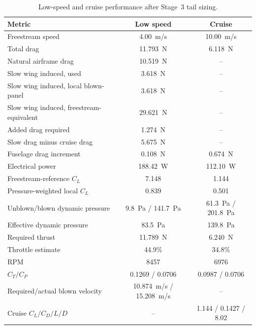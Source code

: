 \documentclass[11pt]{article}
\begin{document}
\begin{table}[H]
\centering
\begin{tabular}{lcc}
\toprule
Metric & Low speed & Cruise \\
\midrule
Freestream speed & \SI{4.00}{m/s} & \SI{10.00}{m/s} \\
Total drag & \SI{11.793}{N} & \SI{6.118}{N} \\
Natural airframe drag & \SI{10.519}{N} & -- \\
Slow wing induced, used & \SI{3.618}{N} & -- \\
Slow wing induced, local blown-panel & \SI{3.618}{N} & -- \\
Slow wing induced, freestream-equivalent & \SI{29.621}{N} & -- \\
Added drag required & \SI{1.274}{N} & -- \\
Slow drag minus cruise drag & \SI{5.675}{N} & -- \\
Fuselage drag increment & \SI{0.108}{N} & \SI{0.674}{N} \\
Electrical power & \SI{188.42}{W} & \SI{112.10}{W} \\
Freestream-reference \(C_L\) & 7.148 & 1.144 \\
Pressure-weighted local \(C_L\) & 0.839 & 0.501 \\
Unblown/blown dynamic pressure & \SI{9.8}{Pa} / \SI{141.7}{Pa} & \SI{61.3}{Pa} / \SI{201.8}{Pa} \\
Effective dynamic pressure & \SI{83.5}{Pa} & \SI{139.8}{Pa} \\
Required thrust & \SI{11.789}{N} & \SI{6.240}{N} \\
Throttle estimate & 44.9\% & 34.8\% \\
RPM & \num{8457} & \num{6976} \\
\(C_T/C_P\) & 0.1269 / 0.0706 & 0.0987 / 0.0706 \\
Required/actual blown velocity & \SI{10.874}{m/s} / \SI{15.208}{m/s} & -- \\
Cruise \(C_L/C_D/L/D\) & -- & 1.144 / 0.1427 / 8.02 \\
\bottomrule
\end{tabular}
\caption{Low-speed and cruise performance after Stage~3 tail sizing.}
\label{tab:stage3-performance}
\end{table}
\end{document}
